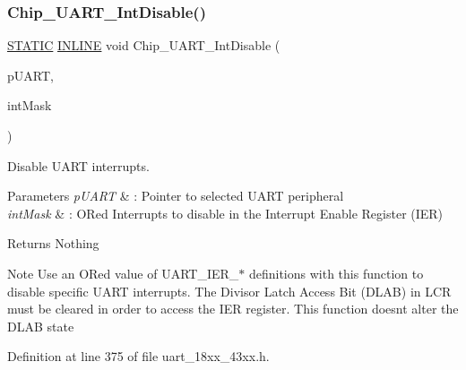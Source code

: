 \subsubsection{\texorpdfstring{Chip\+\_\+\+U\+A\+R\+T\+\_\+\+Int\+Disable()}{Chip\_UART\_IntDisable()}}
{\footnotesize\ttfamily \hyperlink{group___l_p_c___types___public___macros_ga10b2d890d871e1489bb02b7e70d9bdfb}{S\+T\+A\+T\+IC} \hyperlink{spifi__18xx__43xx_8h_a2eb6f9e0395b47b8d5e3eeae4fe0c116}{I\+N\+L\+I\+NE} void Chip\+\_\+\+U\+A\+R\+T\+\_\+\+Int\+Disable (\begin{DoxyParamCaption}\item[{\hyperlink{struct_l_p_c___u_s_a_r_t___t}{L\+P\+C\+\_\+\+U\+S\+A\+R\+T\+\_\+T} $\ast$}]{p\+U\+A\+RT,  }\item[{uint32\+\_\+t}]{int\+Mask }\end{DoxyParamCaption})}



Disable U\+A\+RT interrupts. 


\begin{DoxyParams}{Parameters}
{\em p\+U\+A\+RT} & \+: Pointer to selected U\+A\+RT peripheral \\
\hline
{\em int\+Mask} & \+: OR\textquotesingle{}ed Interrupts to disable in the Interrupt Enable Register (I\+ER) \\
\hline
\end{DoxyParams}
\begin{DoxyReturn}{Returns}
Nothing 
\end{DoxyReturn}
\begin{DoxyNote}{Note}
Use an OR\textquotesingle{}ed value of U\+A\+R\+T\+\_\+\+I\+E\+R\+\_\+$\ast$ definitions with this function to disable specific U\+A\+RT interrupts. The Divisor Latch Access Bit (D\+L\+AB) in L\+CR must be cleared in order to access the I\+ER register. This function doesn\textquotesingle{}t alter the D\+L\+AB state 
\end{DoxyNote}


Definition at line 375 of file uart\+\_\+18xx\+\_\+43xx.\+h.

\mbox{\label{group___u_a_r_t__18_x_x__43_x_x_ga5a816f48dc294f330cc2cc7b32f9e88b}} 
